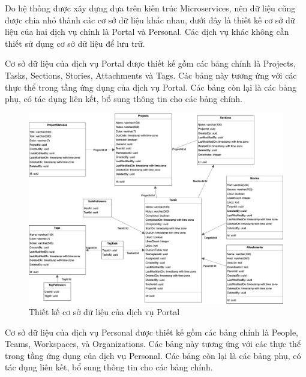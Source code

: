\documentclass[../DoAn.tex]{subfiles}
\begin{document}
Do hệ thống được xây dựng dựa trên kiến trúc Microservices, nên dữ liệu cũng được chia nhỏ thành các cơ sở dữ liệu khác nhau, dưới đây là thiết kế cơ sở dữ liệu của
hai dịch vụ chính là Portal và Personal. Các dịch vụ khác không cần thiết sử dụng cơ sở dữ liệu để lưu trữ.

Cơ sở dữ liệu của dịch vụ Portal được thiết kế gồm các bảng chính là Projects, Tasks, Sections, Stories, Attachments và Tags. Các bảng này tương ứng với các thực thể
trong tầng ứng dụng của dịch vụ Portal. Các bảng còn lại là các bảng phụ, có tác dụng liên kết, bổ sung thông tin cho các bảng chính.

\begin{figure}[H]
    \centering
    \includegraphics[width=1.1\linewidth]{Hinhve/PortalDbDiagram.png}
    \caption{Thiết kế cơ sở dữ liệu của dịch vụ Portal}
    \label{fig:PortalDbDiagram}
\end{figure}

Cơ sở dữ liệu của dịch vụ Personal được thiết kế gồm các bảng chính là People, Teams, Workspaces, và Organizations. Các bảng này tương ứng với các thực thể
trong tầng ứng dụng của dịch vụ Personal. Các bảng còn lại là các bảng phụ, có tác dụng liên kết, bổ sung thông tin cho các bảng chính.
\end{document}
